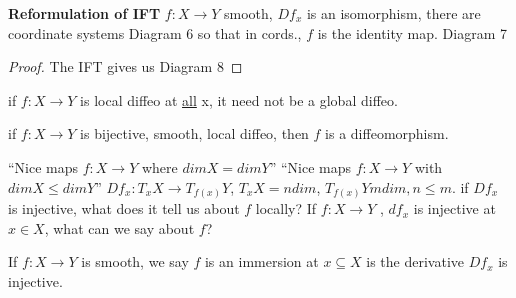 \textbf{Reformulation of IFT}
\newline
  $f: X \to Y$ smooth, $Df_x$ is an isomorphism, there are coordinate systems
  \newline Diagram 6
  \newline so that in cords., $f$ is the identity map.
  \newline Diagram 7
\begin{proof}
  The IFT gives us
    \newline Diagram 8
    \qedhere
\end{proof}
if $f: X \to Y$ is local diffeo at \underline{all} x, it need not be a global diffeo.
\begin{exercise}
  if $f: X \to Y$ is bijective, smooth, local diffeo, then $f$ is a diffeomorphism.
\end{exercise}

``Nice maps $f: X \to Y$ where $dim X=dim Y$''
\newline ``Nice maps $f: X \to Y$ with $dimX\leq dim Y$''
\newline $Df_x: T_xX \to T_{f(x)}Y$, $T_xX=ndim$, $T_{f(x)}Y mdim, n\leq m$.
if $Df_x$ is injective, what does it tell us about $f$ locally?
\newline If $f: X \to Y$ , $df_x$ is injective at $x\in X$, what can we say about $f$?
\begin{definition}
  If $f: X \to Y$ is smooth, we say $f$ is an immersion at $x\subseteq X$ is the derivative $Df_x$ is injective.
\end{definition}

